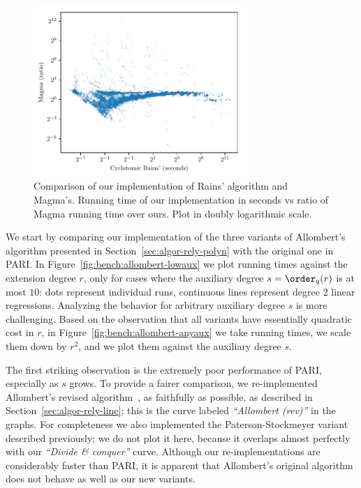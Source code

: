 \begin{figure}
  \centering
  \includegraphics[width=8cm]{ffisom/bench-magma}
  \caption{Comparison of our implementation of Rains' algorithm and
    Magma's. Running time of our implementation in seconds vs ratio of
    Magma running time over ours. Plot in doubly logarithmic scale.}
  \label{fig:bench:magma}
\end{figure}

We start by comparing our implementation of the three variants of
Allombert's algorithm presented in Section~\ref{sec:algor-rely-polyn}
with the original one in PARI. %
In Figure~\ref{fig:bench:allombert-lowaux} we plot running times
against the extension degree $r$, only for cases where the auxiliary
degree $s=\order_q(r)$ is at most $10$: dots represent individual
runs, continuous lines represent degree $2$ linear regressions. %
Analyzing the behavior for arbitrary auxiliary degree $s$ is more
challenging. %
Based on the observation that all variants have essentially quadratic
cost in $r$, in Figure~\ref{fig:bench:allombert-anyaux} we take
running times, we scale them down by $r^2$, and we plot them against
the auxiliary degree $s$. %

The first striking observation is the extremely poor performance of
PARI, especially as $s$ grows. %
To provide a fairer comparison, we re-implemented Allombert's revised
algorithm~\cite{Allombert02-rev}, as faithfully as possible, as
described in Section~\ref{sec:algor-rely-line}; this is the curve
labeled \emph{``Allombert (rev)''} in the graphs. %
For completeness we also implemented the Paterson-Stockmeyer variant
described previously; we do not plot it here, because it overlaps
almost perfectly with our \emph{``Divide \& conquer''} curve. %
Although our re-implementations are considerably faster than PARI, it
is apparent that Allombert's original algorithm does not behave as
well as our new variants.

